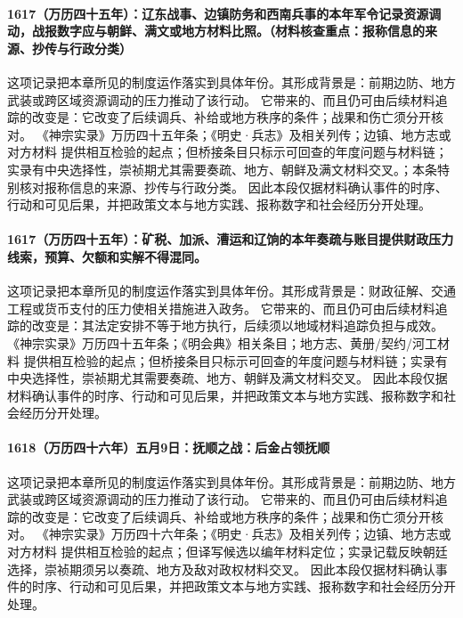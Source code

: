\paragraph{1617（万历四十五年）：辽东战事、边镇防务和西南兵事的本年军令记录资源调动，战报数字应与朝鲜、满文或地方材料比照。（材料核查重点：报称信息的来源、抄传与行政分类）} 这项记录把本章所见的制度运作落实到具体年份。其形成背景是：前期边防、地方武装或跨区域资源调动的压力推动了该行动。 它带来的、而且仍可由后续材料追踪的改变是：它改变了后续调兵、补给或地方秩序的条件；战果和伤亡须分开核对。 《神宗实录》万历四十五年条；《明史·兵志》及相关列传；边镇、地方志或对方材料 提供相互检验的起点；但桥接条目只标示可回查的年度问题与材料链；实录有中央选择性，崇祯期尤其需要奏疏、地方、朝鲜及满文材料交叉。；本条特别核对报称信息的来源、抄传与行政分类。 因此本段仅据材料确认事件的时序、行动和可见后果，并把政策文本与地方实践、报称数字和社会经历分开处理。

\paragraph{1617（万历四十五年）：矿税、加派、漕运和辽饷的本年奏疏与账目提供财政压力线索，预算、欠额和实解不得混同。} 这项记录把本章所见的制度运作落实到具体年份。其形成背景是：财政征解、交通工程或货币支付的压力使相关措施进入政务。 它带来的、而且仍可由后续材料追踪的改变是：其法定安排不等于地方执行，后续须以地域材料追踪负担与成效。 《神宗实录》万历四十五年条；《明会典》相关条目；地方志、黄册/契约/河工材料 提供相互检验的起点；但桥接条目只标示可回查的年度问题与材料链；实录有中央选择性，崇祯期尤其需要奏疏、地方、朝鲜及满文材料交叉。 因此本段仅据材料确认事件的时序、行动和可见后果，并把政策文本与地方实践、报称数字和社会经历分开处理。

\paragraph{1618（万历四十六年）五月9日：抚顺之战：后金占领抚顺} 这项记录把本章所见的制度运作落实到具体年份。其形成背景是：前期边防、地方武装或跨区域资源调动的压力推动了该行动。 它带来的、而且仍可由后续材料追踪的改变是：它改变了后续调兵、补给或地方秩序的条件；战果和伤亡须分开核对。 《神宗实录》万历四十六年条；《明史·兵志》及相关列传；边镇、地方志或对方材料 提供相互检验的起点；但译写候选以编年材料定位；实录记载反映朝廷选择，崇祯期须另以奏疏、地方及敌对政权材料交叉。 因此本段仅据材料确认事件的时序、行动和可见后果，并把政策文本与地方实践、报称数字和社会经历分开处理。

